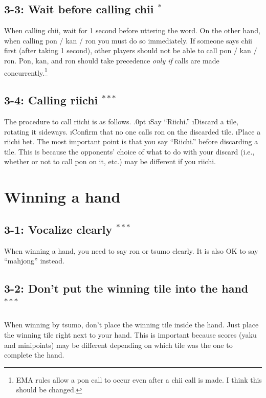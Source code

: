 \subsection*{3-3: Wait before calling {\jap chii} $^{*}$}
When calling {\jap chii}, wait for 1 second before uttering the word. On the other hand, when calling {\jap pon} / {\jap kan} / {\jap ron} you must do so immediately. If someone says {\jap chii} first (after taking 1 second), other players should not be able to call {\jap pon} / {\jap kan} / {\jap ron}. {\jap Pon}, {\jap kan}, and {\jap ron} should take precedence \emph{only if} calls are made concurrently.\footnote{EMA rules allow a {\jap pon} call to occur even after a {\jap chii} call is made. I think this should be changed.}

\subsection*{3-4: Calling riichi $^{***}$}
The procedure to call riichi is as follows.
\be\itemsep.0pt
\i Say ``{\jap Riichi}.''
\i Discard a tile, rotating it sideways.
\i Confirm that no one calls {\jap ron} on the discarded tile.
\i Place a riichi bet.
\ee
The most important point is that you say ``{\jap Riichi}.'' before discarding a tile. This is because the opponents' choice of what to do with your discard (i.e., whether or not to call {\jap pon} on it, etc.) may be different if you riichi.

\section{Winning a hand}

\subsection*{3-1: Vocalize clearly $^{***}$}
When winning a hand, you need to say {\jap ron} or {\jap tsumo} clearly. It is also OK to say ``mahjong'' instead. 

\subsection*{3-2: Don't put the winning tile into the hand $^{***}$}
When winning by {\jap tsumo}, don't place the winning tile inside the hand. Just place the winning tile right next to your hand. This is important because scores ({\jap yaku} and minipoints) may be different depending on which tile was the one to complete the hand. 

